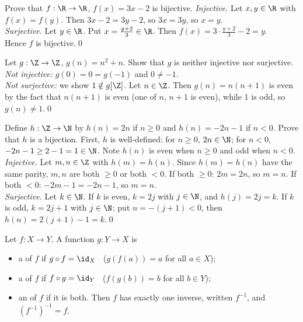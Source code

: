 \begin{hexample}
Prove that $f:\R\to\R$, $f(x)=3x-2$ is bijective.
\solution
\emph{Injective.} Let $x,y\in\R$ with $f(x)=f(y)$. Then $3x-2=3y-2$, so $3x=3y$, so $x=y$.\\
\emph{Surjective.} Let $y\in\R$. Put $x=\frac{y+2}3\in\R$. Then $f(x)=3\cdot\frac{y+2}3-2=y$.\\
Hence $f$ is bijective.\qed
\end{hexample}

\begin{hexample}
Let $g:\Z\to\Z$, $g(n)=n^2+n$. Show that $g$ is neither injective nor surjective.
\solution
\emph{Not injective:} $g(0)=0=g(-1)$ and $0\neq-1$.\\
\emph{Not surjective:} we show $1\notin g[\Z]$. Let $n\in\Z$. Then $g(n)=n(n+1)$ is even by the fact that $n(n+1)$ is even (one of $n$, $n+1$ is even), while $1$ is odd, so $g(n)\neq1$.\qed
\end{hexample}

\begin{hexample}\label{ex:zigzag}
Define $h:\Z\to\N$ by $h(n)=2n$ if $n\ge0$ and $h(n)=-2n-1$ if $n<0$. Prove that $h$ is a bijection.
\solution
First, $h$ is well-defined: for $n\ge0$, $2n\in\N$; for $n<0$, $-2n-1\ge2-1=1\in\N$. Note $h(n)$ is even when $n\ge0$ and odd when $n<0$.\\
\emph{Injective.} Let $m,n\in\Z$ with $h(m)=h(n)$. Since $h(m)=h(n)$ have the same parity, $m,n$ are both $\ge0$ or both $<0$. If both $\ge0$: $2m=2n$, so $m=n$. If both $<0$: $-2m-1=-2n-1$, so $m=n$.\\
\emph{Surjective.} Let $k\in\N$. If $k$ is even, $k=2j$ with $j\in\N$, and $h(j)=2j=k$. If $k$ is odd, $k=2j+1$ with $j\in\N$; put $n=-(j+1)<0$, then $h(n)=2(j+1)-1=k$.\qed
\end{hexample}

\begin{key}[Inverses]
Let $f:X\to Y$. A function $g:Y\to X$ is
\begin{itemize}
\item a  of $f$ if $g\circ f=\id_X$ \ (\ie $g(f(a))=a$ for all $a\in X$);
\item a  of $f$ if $f\circ g=\id_Y$ \ (\ie $f(g(b))=b$ for all $b\in Y$);
\item an  of $f$ if it is both. Then $f$ has exactly one inverse, written $f^{-1}$, and $(f^{-1})^{-1}=f$.
\end{itemize}
\end{key}

